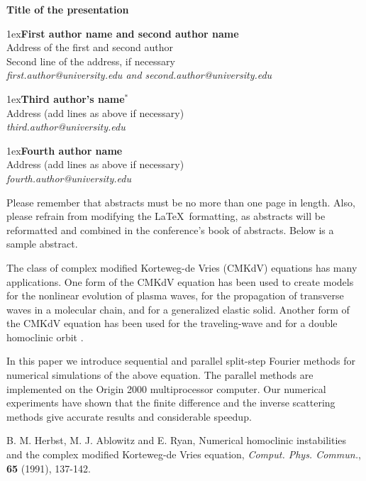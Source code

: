 \documentclass[12pt]{article}
\def\title#1{{\large\bf #1}}
\def\author#1#2#3{\vglue1ex{\bf #1}\\[0.4ex]{\small #2}\\[0.2ex]\textit{\small #3}}
\begin{document}
\pagestyle{empty}
\begin{center}


\title{Title of the presentation}

\author{First author name and second author name}
  {Address of the first and second author\\Second line of the address, if necessary}
  {first.author@university.edu and second.author@university.edu} 

\author{Third author's name$^*$}
  {Address (add lines as above if necessary)}
  {third.author@university.edu}

\author{Fourth author name}
  {Address (add lines as above if necessary)}
  {fourth.author@university.edu}

\end{center}

\abstract

Please remember that abstracts must be no more than one page in length.
Also, please refrain from modifying the \LaTeX\ formatting, as abstracts will be reformatted and combined in the conference's book of abstracts.
Below is a sample abstract.

The class of complex modified Korteweg-de Vries (CMKdV) equations has many
applications. One form of the CMKdV equation has been used to create models 
for the nonlinear evolution of plasma waves, for the propagation of transverse 
waves in a molecular chain, and for a generalized elastic solid.
Another form of the CMKdV equation has been used for the traveling-wave and
for a double homoclinic orbit \cite{Herbst_Ablowitz_Ryan}.

In this paper we introduce sequential and parallel split-step Fourier methods
for numerical simulations of the above equation.
The parallel methods are implemented on the Origin 2000 multiprocessor computer.
Our numerical experiments have shown that the finite difference and the
inverse scattering methods give accurate results and considerable speedup.

\begin{thebibliography}{1}

 B. M. Herbst, M. J. Ablowitz and E. Ryan,
Numerical homoclinic instabilities and the complex modified Korteweg-de Vries equation,
{\sl Comput. Phys. Commun.}, {\bf 65} (1991), 137-142.

\end{thebibliography}
\end{document}
